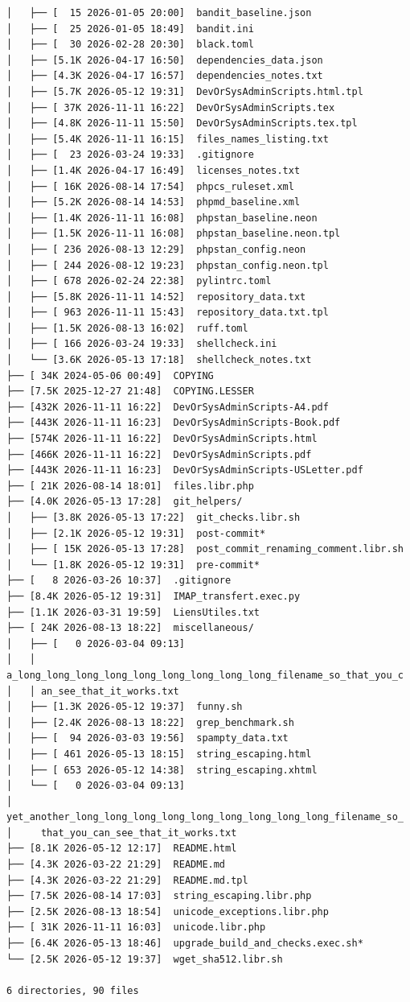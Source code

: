 \documentclass{article}
\begin{document}
\begin{verbatim}
│   ├── [  15 2026-01-05 20:00]  bandit_baseline.json
│   ├── [  25 2026-01-05 18:49]  bandit.ini
│   ├── [  30 2026-02-28 20:30]  black.toml
│   ├── [5.1K 2026-04-17 16:50]  dependencies_data.json
│   ├── [4.3K 2026-04-17 16:57]  dependencies_notes.txt
│   ├── [5.7K 2026-05-12 19:31]  DevOrSysAdminScripts.html.tpl
│   ├── [ 37K 2026-11-11 16:22]  DevOrSysAdminScripts.tex
│   ├── [4.8K 2026-11-11 15:50]  DevOrSysAdminScripts.tex.tpl
│   ├── [5.4K 2026-11-11 16:15]  files_names_listing.txt
│   ├── [  23 2026-03-24 19:33]  .gitignore
│   ├── [1.4K 2026-04-17 16:49]  licenses_notes.txt
│   ├── [ 16K 2026-08-14 17:54]  phpcs_ruleset.xml
│   ├── [5.2K 2026-08-14 14:53]  phpmd_baseline.xml
│   ├── [1.4K 2026-11-11 16:08]  phpstan_baseline.neon
│   ├── [1.5K 2026-11-11 16:08]  phpstan_baseline.neon.tpl
│   ├── [ 236 2026-08-13 12:29]  phpstan_config.neon
│   ├── [ 244 2026-08-12 19:23]  phpstan_config.neon.tpl
│   ├── [ 678 2026-02-24 22:38]  pylintrc.toml
│   ├── [5.8K 2026-11-11 14:52]  repository_data.txt
│   ├── [ 963 2026-11-11 15:43]  repository_data.txt.tpl
│   ├── [1.5K 2026-08-13 16:02]  ruff.toml
│   ├── [ 166 2026-03-24 19:33]  shellcheck.ini
│   └── [3.6K 2026-05-13 17:18]  shellcheck_notes.txt
├── [ 34K 2024-05-06 00:49]  COPYING
├── [7.5K 2025-12-27 21:48]  COPYING.LESSER
├── [432K 2026-11-11 16:22]  DevOrSysAdminScripts-A4.pdf
├── [443K 2026-11-11 16:23]  DevOrSysAdminScripts-Book.pdf
├── [574K 2026-11-11 16:22]  DevOrSysAdminScripts.html
├── [466K 2026-11-11 16:22]  DevOrSysAdminScripts.pdf
├── [443K 2026-11-11 16:23]  DevOrSysAdminScripts-USLetter.pdf
├── [ 21K 2026-08-14 18:01]  files.libr.php
├── [4.0K 2026-05-13 17:28]  git_helpers/
│   ├── [3.8K 2026-05-13 17:22]  git_checks.libr.sh
│   ├── [2.1K 2026-05-12 19:31]  post-commit*
│   ├── [ 15K 2026-05-13 17:28]  post_commit_renaming_comment.libr.sh
│   └── [1.8K 2026-05-12 19:31]  pre-commit*
├── [   8 2026-03-26 10:37]  .gitignore
├── [8.4K 2026-05-12 19:31]  IMAP_transfert.exec.py
├── [1.1K 2026-03-31 19:59]  LiensUtiles.txt
├── [ 24K 2026-08-13 18:22]  miscellaneous/
│   ├── [   0 2026-03-04 09:13]
│   │ a_long_long_long_long_long_long_long_long_long_filename_so_that_you_c
│   │ an_see_that_it_works.txt
│   ├── [1.3K 2026-05-12 19:37]  funny.sh
│   ├── [2.4K 2026-08-13 18:22]  grep_benchmark.sh
│   ├── [  94 2026-03-03 19:56]  spampty_data.txt
│   ├── [ 461 2026-05-13 18:15]  string_escaping.html
│   ├── [ 653 2026-05-12 14:38]  string_escaping.xhtml
│   └── [   0 2026-03-04 09:13]
│     yet_another_long_long_long_long_long_long_long_long_long_filename_so_
│     that_you_can_see_that_it_works.txt
├── [8.1K 2026-05-12 12:17]  README.html
├── [4.3K 2026-03-22 21:29]  README.md
├── [4.3K 2026-03-22 21:29]  README.md.tpl
├── [7.5K 2026-08-14 17:03]  string_escaping.libr.php
├── [2.5K 2026-08-13 18:54]  unicode_exceptions.libr.php
├── [ 31K 2026-11-11 16:03]  unicode.libr.php
├── [6.4K 2026-05-13 18:46]  upgrade_build_and_checks.exec.sh*
└── [2.5K 2026-05-12 19:37]  wget_sha512.libr.sh

6 directories, 90 files
\end{verbatim}
\end{document}
